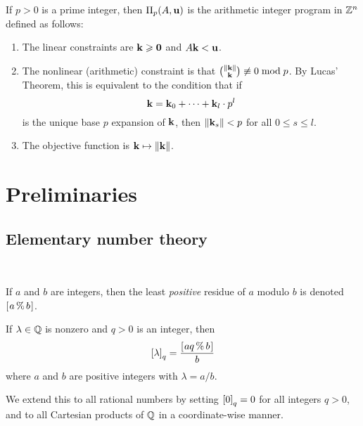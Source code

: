 \documentclass[11pt]{amsart}
\renewcommand{\!}[1]{{\color{red}\text{$\star$\,}#1\,$\star$}}
\begin{document}


\begin{definition} If $p>0$ is a prime integer, then $\Pi_p(A, \mathbf{u})$ is the arithmetic integer program in $\mathbb{Z}^n$ defined as follows:
\begin{enumerate}
\item The linear constraints are $\mathbf{k} \geqslant \mathbf{0}$ and $A \mathbf{k} < \mathbf{u}$.  
\item The nonlinear (arithmetic) constraint is that $\binom{\| \mathbf{k} \|}{\mathbf{k}} \not \equiv 0 \bmod p$.  By Lucas' Theorem, this is equivalent to the condition that  if \[ \mathbf{k} = \mathbf{k}_0 + \cdots + \mathbf{k}_l \cdot  p^l\] is the unique base $p$ expansion of $\mathbf{k}$, then $\| \mathbf{k}_s \| < p$ for all $0 \leq s \leq l $.
\item The objective function is $\mathbf{k} \mapsto \| \mathbf{k} \|$.
\end{enumerate}
\end{definition}


\newpage

\section{Preliminaries}



\subsection{Elementary number theory}   

\ 


If $a$ and $b$ are integers, then the least \emph{positive} residue of $a$ modulo $b$ is denoted $[ \hspace{.01in} a \, \% \, b \hspace{.01in} ]$. 

\begin{definition}  If $\lambda \in \mathbb{Q}$ is nonzero and $q>0$ is an integer, then \[ \left[ \lambda \right]_q = \frac{ [ \hspace{.01in} aq \, \% \, b \hspace{.01in} ]}{b} \] 
where $a$ and $b$ are positive integers with $\lambda = a/b$.

We extend this to all rational numbers by setting $\left[ 0 \right]_q = 0$ for all integers $q>0$, and to all Cartesian products of $\mathbb{Q}$ in a coordinate-wise manner.
\end{definition}
\end{document}
